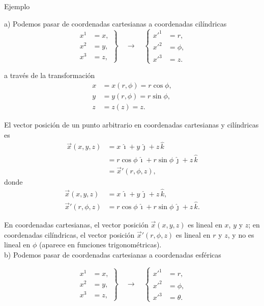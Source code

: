 \documentclass[../apunte_mecanica_clasica.tex]{subfiles}%
\begin{document}
\begin{apuntebloque}{Ejemplo}

a) Podemos pasar de coordenadas cartesianas a coordenadas cilíndricas
\begin{equation*}
    \left.
    \begin{aligned}
        x^{1}&=x,\\
        x^2&=y,\\
        x^3&=z,
    \end{aligned}
    \right\} \quad \longrightarrow\quad
        \left\{
    \begin{aligned}
        x'^{1}&=r,\\
        x'^2&=\phi,\\
        x'^3&=z.
    \end{aligned}
    \right.
\end{equation*}

a través de la transformación
\begin{align*}
x &= x(r,\phi)=r\cos\phi,\\
y &= y(r,\phi)=r\sin\phi,\\
z &= z(z)=z.
\end{align*}

El vector posición de un punto arbitrario en coordenadas cartesianas y cilíndricas es
\begin{align*}
\vec{x}(x,y,z)&=x\,\hat{\imath}+y\,\hat{\jmath}+z\,\hat{k}\\[4pt]
&= r\cos\phi\,\hat{\imath}+r\sin\phi\,\hat{\jmath}+z\,\hat{k}\\[4pt]
&= \vec{x}'(r,\phi,z),
\end{align*}
donde
\begin{align*}
\vec{x}(x,y,z)&=x\,\hat{\imath}+y\,\hat{\jmath}+z\,\hat{k},\\[4pt]
\vec{x}'(r,\phi,z)&=r\cos\phi\,\hat{\imath}+r\sin\phi\,\hat{\jmath}+z\,\hat{k}.
\end{align*}

En coordenadas cartesianas, el vector posición $\vec{x}(x,y,z)$ es lineal en $x$, $y$ y $z$; en coordenadas cilíndricas, el vector posición $\vec{x}'(r,\phi,z)$ es lineal en $r$ y $z$, y no es lineal en $\phi$ (aparece en funciones trigonométricas).
\\

b) Podemos pasar de coordenadas cartesianas a coordenadas esféricas

\begin{equation*}
    \left.
    \begin{aligned}
        x^{1}&=x,\\
        x^2&=y,\\
        x^3&=z,
    \end{aligned}
    \right\} \quad \longrightarrow\quad
        \left\{
    \begin{aligned}
        x'^{1}&=r,\\
        x'^2&=\phi,\\
        x'^3&=\theta.
    \end{aligned}
    \right.
\end{equation*}


\end{apuntebloque}
\end{document}
